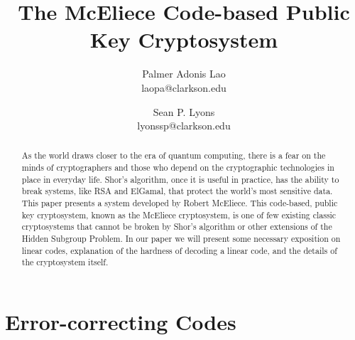 \documentclass{article}
\theoremstyle{definition}
\begin{document}
\title{The McEliece Code-based Public Key Cryptosystem}

\author{Palmer Adonis Lao\\
 laopa@clarkson.edu\\
\and
Sean P. Lyons\\
lyonssp@clarkson.edu\\}
\maketitle
\thispagestyle{empty}

\begin{abstract}
As the world draws closer to the era of quantum computing, there is a fear on the minds of cryptographers and those who depend on the cryptographic technologies in place in everyday life.   Shor's algorithm, once it is useful in practice, has the ability to break systems, like RSA and ElGamal, that protect the world's most sensitive data.  This paper presents a system developed by Robert McEliece.  This code-based, public key cryptosystem, known as the McEliece cryptosystem, is one of few existing classic cryptosystems that cannot be broken by Shor's algorithm or other extensions of the Hidden Subgroup Problem.  In our paper we will present some necessary exposition on linear codes, explanation of the hardness of decoding a linear code, and the details of the cryptosystem itself.   
\end{abstract}

\section{Error-correcting Codes}
\end{document}
